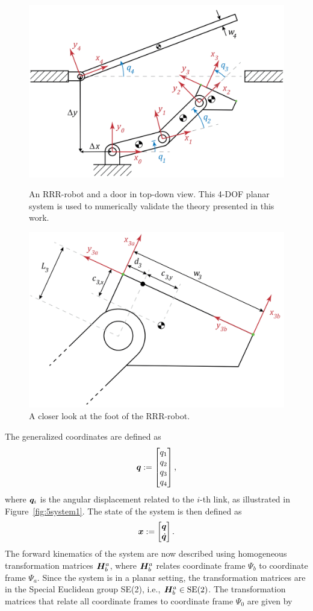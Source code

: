 \documentclass[../DC2017114Bouma.tex]{subfiles}
\begin{document}
%
%
\begin{figure}[bt!]
\centering
\includegraphics[width=.7\textwidth]{system.PNG}\caption{An RRR-robot and a door in top-down view. This 4-DOF planar system is used to numerically validate the theory presented in this work.}\label{fig:5system1}
\includegraphics[width=.7\textwidth]{system2.PNG}\caption{A closer look at the foot of the RRR-robot.}
\label{fig:5system2}
\end{figure}

The generalized coordinates are defined as 
\begin{align}
{\boldsymbol{q}} := \begin{bmatrix}
q_1\\q_2\\q_3\\q_4
\end{bmatrix},
\end{align}
where ${\boldsymbol{q}}_i$ is the angular displacement related to the $i$-th link, as illustrated in Figure~\ref{fig:5system1}. The state of the system is then defined as
\begin{align}
{\boldsymbol{x}} := \begin{bmatrix}
{\boldsymbol{q}}\\\dot{{\boldsymbol{q}}}
\end{bmatrix}.
\end{align}
The forward kinematics of the system are now described using homogeneous transformation matrices ${\boldsymbol{H}}^a_b$, where ${\boldsymbol{H}}^a_b$ relates coordinate frame $\Psi_b$ to coordinate frame $\Psi_a$. Since the system is in a planar setting, the transformation matrices are in the Special Euclidean group SE(2), i.e., ${\boldsymbol{H}}^a_b\in \textnormal{SE}(2)$. The transformation matrices that relate all coordinate frames to coordinate frame $\Psi_0$ are given by
\end{document}

